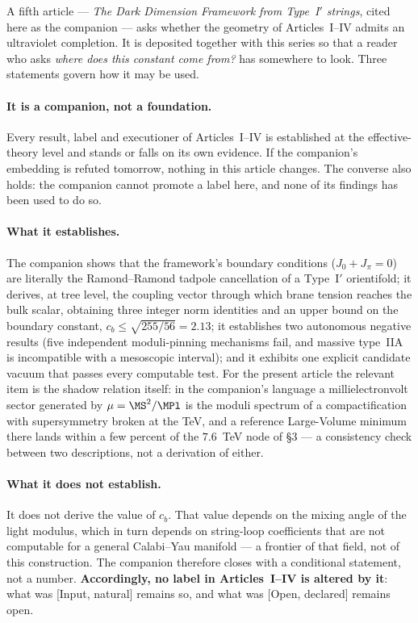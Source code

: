 A fifth article --- \emph{The Dark Dimension Framework from Type~I$'$ strings}, cited here as the companion --- asks whether the geometry of Articles~I--IV admits an ultraviolet completion. It is deposited together with this series so that a reader who asks \emph{where does this constant come from?} has somewhere to look. Three statements govern how it may be used.

\paragraph{It is a companion, not a foundation.} Every result, label and executioner of Articles~I--IV is established at the effective-theory level and stands or falls on its own evidence. If the companion's embedding is refuted tomorrow, nothing in this article changes. The converse also holds: the companion cannot promote a label here, and none of its findings has been used to do so.

\paragraph{What it establishes.} The companion shows that the framework's boundary conditions ($J_{0}+J_{\pi}=0$) are literally the Ramond--Ramond tadpole cancellation of a Type~I$'$ orientifold; it derives, at tree level, the coupling vector through which brane tension reaches the bulk scalar, obtaining three integer norm identities and an upper bound on the boundary constant, $c_{b}\leq\sqrt{255/56}=2.13$; it establishes two autonomous negative results (five independent moduli-pinning mechanisms fail, and massive type~IIA is incompatible with a mesoscopic interval); and it exhibits one explicit candidate vacuum that passes every computable test. For the present article the relevant item is the shadow relation itself: in the companion's language a millielectronvolt sector generated by $\mu=\MS^{2}/\MPl$ is the moduli spectrum of a compactification with supersymmetry broken at the TeV, and a reference Large-Volume minimum there lands within a few percent of the $7.6$~TeV node of \S3 --- a consistency check between two descriptions, not a derivation of either.

\paragraph{What it does not establish.} It does not derive the value of $c_{b}$. That value depends on the mixing angle of the light modulus, which in turn depends on string-loop coefficients that are not computable for a general Calabi--Yau manifold --- a frontier of that field, not of this construction. The companion therefore closes with a conditional statement, not a number. \textbf{Accordingly, no label in Articles~I--IV is altered by it}: what was [Input, natural] remains so, and what was [Open, declared] remains open.


